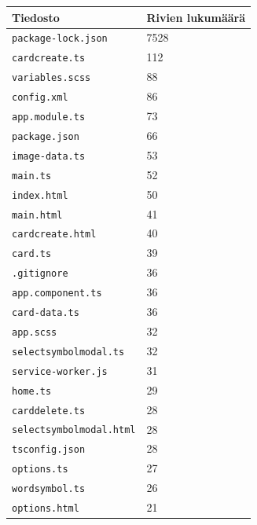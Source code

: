 \documentclass[utf8]{gradu3}
\begin{document}
\begin{center}
    \begin{tabular}{ | l | l |}
    \hline
    \textbf{Tiedosto} & \textbf{Rivien lukumäärä} \\ \hline
    \texttt{package-lock.json} & 7528 \\ \hline
    \texttt{cardcreate.ts} & 112 \\ \hline
    \texttt{variables.scss} & 88 \\ \hline
    \texttt{config.xml} & 86 \\ \hline
    \texttt{app.module.ts} & 73 \\ \hline
    \texttt{package.json} & 66 \\ \hline
    \texttt{image-data.ts} & 53 \\ \hline
    \texttt{main.ts} & 52 \\ \hline
    \texttt{index.html} & 50 \\ \hline
    \texttt{main.html} & 41 \\ \hline
    \texttt{cardcreate.html} & 40 \\ \hline
    \texttt{card.ts} & 39 \\ \hline
    \texttt{.gitignore} & 36 \\ \hline
    \texttt{app.component.ts} & 36 \\ \hline
    \texttt{card-data.ts} & 36 \\ \hline
    \texttt{app.scss} & 32 \\ \hline
    \texttt{selectsymbolmodal.ts} & 32 \\ \hline
    \texttt{service-worker.js} & 31 \\ \hline
    \texttt{home.ts} & 29 \\ \hline
    \texttt{carddelete.ts} & 28 \\ \hline
    \texttt{selectsymbolmodal.html} & 28 \\ \hline
    \texttt{tsconfig.json} & 28 \\ \hline
    \texttt{options.ts} & 27 \\ \hline
    \texttt{wordsymbol.ts} & 26 \\ \hline
    \texttt{options.html} & 21 \\ \hline
    \end{tabular}
\end{center}
\end{document}
